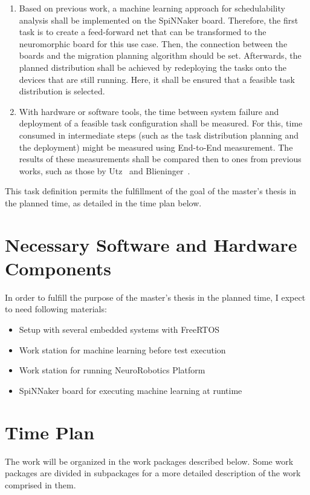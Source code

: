 \begin{enumerate}
\item	Based on previous work, a machine learning approach for schedulability analysis shall be implemented on the SpiNNaker board. Therefore, the first task is to create a feed-forward net that can be transformed to the neuromorphic board for this use case. Then, the connection between the boards and the migration planning algorithm should be set. Afterwards, the planned distribution shall be achieved by redeploying the tasks onto the devices that are still running. Here, it shall be ensured that a feasible task distribution is selected.
\item	With hardware or software tools, the time between system failure and deployment of a feasible task configuration shall be measured. For this, time consumed in intermediate steps (such as the task distribution planning and the deployment) might be measured using End-to-End measurement. The results of these measurements shall be compared then to ones from previous works, such as those by Utz~\parencite{utz1} and Blieninger~\parencite{blieninger1}.
\end{enumerate}

This task definition permits the fulfillment of the goal of the master’s thesis in the planned time, as detailed in the time plan below. 

\chapter{Necessary Software and Hardware Components}\label{chapter:necessarycomponents}
In order to fulfill the purpose of the master’s thesis in the planned time, I expect to need following materials:

\begin{itemize}
\item	Setup with several embedded systems with FreeRTOS
\item	Work station for machine learning before test execution
\item	Work station for running NeuroRobotics Platform
\item	SpiNNaker board for executing machine learning at runtime
\end{itemize}

\chapter{Time Plan}\label{chapter:timeplan}
The work will be organized in the work packages described below. Some work packages are divided in subpackages for a more detailed description of the work comprised in them.

